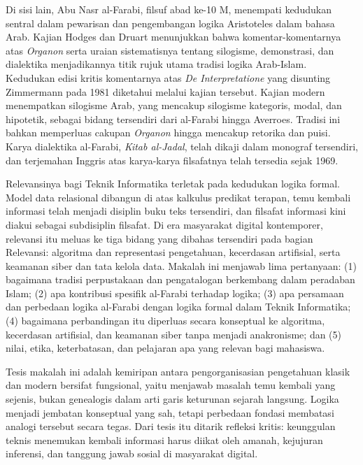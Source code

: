 \documentclass[12pt,a4paper]{article}
\begin{document}
Di sisi lain, Abu Nasr al-Farabi, filsuf abad ke-10 M, menempati kedudukan sentral dalam pewarisan dan pengembangan logika Aristoteles dalam bahasa Arab.\autocite{druart2024} Kajian Hodges dan Druart menunjukkan bahwa komentar-komentarnya atas \emph{Organon} serta uraian sistematisnya tentang silogisme, demonstrasi, dan dialektika menjadikannya titik rujuk utama tradisi logika Arab-Islam.\autocite{hodges-druart2019} Kedudukan edisi kritis komentarnya atas \emph{De Interpretatione} yang disunting Zimmermann pada 1981 diketahui melalui kajian tersebut.\autocite{zimmermann1981} Kajian modern menempatkan silogisme Arab, yang mencakup silogisme kategoris, modal, dan hipotetik, sebagai bidang tersendiri dari al-Farabi hingga Averroes.\autocite{chatti2019} Tradisi ini bahkan memperluas cakupan \emph{Organon} hingga mencakup retorika dan puisi.\autocite{black1990} Karya dialektika al-Farabi, \emph{Kitab al-Jadal}, telah dikaji dalam monograf tersendiri,\autocite{dipasquale2019} dan terjemahan Inggris atas karya-karya filsafatnya telah tersedia sejak 1969.\autocite{mahdi1969}

Relevansinya bagi Teknik Informatika terletak pada kedudukan logika formal. Model data relasional dibangun di atas kalkulus predikat terapan,\autocite{codd1970} temu kembali informasi telah menjadi disiplin buku teks tersendiri,\autocite{manning2008} dan filsafat informasi kini diakui sebagai subdisiplin filsafat.\autocite{adriaans2023} Di era masyarakat digital kontemporer, relevansi itu meluas ke tiga bidang yang dibahas tersendiri pada bagian Relevansi: algoritma dan representasi pengetahuan, kecerdasan artifisial, serta keamanan siber dan tata kelola data. Makalah ini menjawab lima pertanyaan: (1) bagaimana tradisi perpustakaan dan pengatalogan berkembang dalam peradaban Islam; (2) apa kontribusi spesifik al-Farabi terhadap logika; (3) apa persamaan dan perbedaan logika al-Farabi dengan logika formal dalam Teknik Informatika; (4) bagaimana perbandingan itu diperluas secara konseptual ke algoritma, kecerdasan artifisial, dan keamanan siber tanpa menjadi anakronisme; dan (5) nilai, etika, keterbatasan, dan pelajaran apa yang relevan bagi mahasiswa.

Tesis makalah ini adalah kemiripan antara pengorganisasian pengetahuan klasik dan modern bersifat fungsional, yaitu menjawab masalah temu kembali yang sejenis, bukan genealogis dalam arti garis keturunan sejarah langsung. Logika menjadi jembatan konseptual yang sah, tetapi perbedaan fondasi membatasi analogi tersebut secara tegas. Dari tesis itu ditarik refleksi kritis: keunggulan teknis menemukan kembali informasi harus diikat oleh amanah, kejujuran inferensi, dan tanggung jawab sosial di masyarakat digital.
\end{document}
